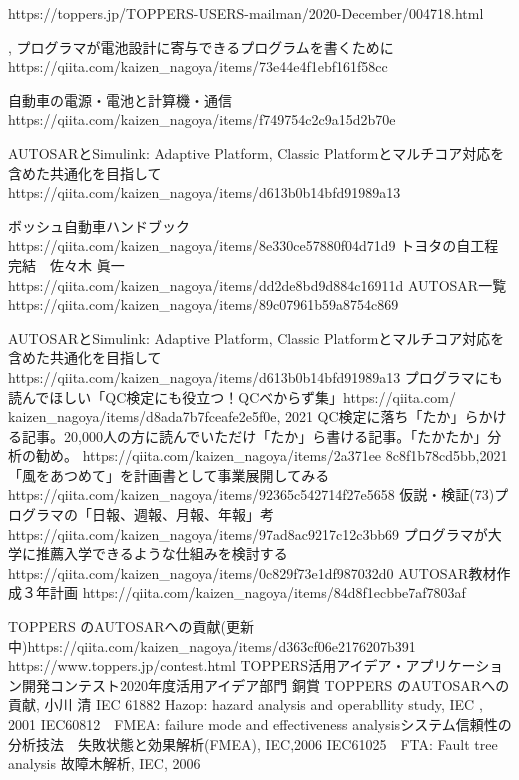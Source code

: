 \documentclass[twocolumn]{article} %
\begin{document}
\begin{thebibliography}{99}
https://toppers.jp/TOPPERS-USERS-mailman/2020-December/004718.html


, 
プログラマが電池設計に寄与できるプログラムを書くために
https://qiita.com/kaizen\_nagoya/items/73e44e4f1ebf161f58cc

 自動車の電源・電池と計算機・通信
https://qiita.com/kaizen\_nagoya/items/f749754c2c9a15d2b70e


AUTOSARとSimulink: Adaptive Platform, Classic Platformとマルチコア対応を含めた共通化を目指して
https://qiita.com/kaizen\_nagoya/items/d613b0b14bfd91989a13

ボッシュ自動車ハンドブック
https://qiita.com/kaizen\_nagoya/items/8e330ce57880f04d71d9
トヨタの自工程完結　佐々木 眞一
https://qiita.com/kaizen\_nagoya/items/dd2de8bd9d884c16911d
AUTOSAR一覧
https://qiita.com/kaizen\_nagoya/items/89c07961b59a8754c869

AUTOSARとSimulink: Adaptive Platform, Classic Platformとマルチコア対応を含めた共通化を目指して
https://qiita.com/kaizen\_nagoya/items/d613b0b14bfd91989a13
 プログラマにも読んでほしい「QC検定にも役立つ！QCべからず集」https://qiita.com/ kaizen\_nagoya/items/d8ada7b7fceafe2e5f0e, 2021
 QC検定に落ち「たか」らかける記事。20,000人の方に読んでいただけ「たか」ら書ける記事。「たかたか」分析の勧め。 https://qiita.com/kaizen\_nagoya/items/2a371ee 8c8f1b78cd5bb,2021
 「風をあつめて」を計画書として事業展開してみる https://qiita.com/kaizen\_nagoya/items/92365c542714f27e5658
 仮説・検証(73)プログラマの「日報、週報、月報、年報」考 https://qiita.com/kaizen\_nagoya/items/97ad8ac9217c12c3bb69
 プログラマが大学に推薦入学できるような仕組みを検討する https://qiita.com/kaizen\_nagoya/items/0c829f73e1df987032d0
 AUTOSAR教材作成３年計画 https://qiita.com/kaizen\_nagoya/items/84d8f1ecbbe7af7803af

 TOPPERS のAUTOSARへの貢献(更新中)https://qiita.com/kaizen\_nagoya/items/d363cf06e2176207b391
 https://www.toppers.jp/contest.html
TOPPERS活用アイデア・アプリケーション開発コンテスト2020年度活用アイデア部門 銅賞
TOPPERS のAUTOSARへの貢献, 小川 清
 IEC 61882 Hazop: hazard analysis and operabllity study, IEC , 2001
 IEC60812　FMEA: failure mode and effectiveness analysisシステム信頼性の分析技法　失敗状態と効果解析(FMEA), IEC,2006
 IEC61025　FTA: Fault tree analysis 故障木解析, IEC, 2006
\end{thebibliography}
\end{document}
